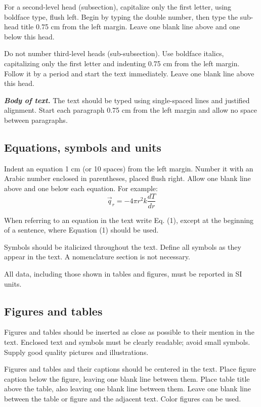 \documentclass[12pt,fleqn]{article}
\begin{document}
For a second-level head (subsection), capitalize only the first letter, using
boldface type, flush left. Begin by typing the double number, then type the
sub-head title 0.75 cm from the left margin. Leave one blank line above and one
below this head.

Do not number third-level heads (sub-subsection). Use boldface italics,
capitalizing only the first letter and indenting 0.75 cm from the left margin.
Follow it by a period and start the text immediately. Leave one blank line
above this head.

\vspace{0.5cm} %
%
\textbf{\textit{Body of text.}} The text should be typed using single-spaced
lines and justified alignment. Start each paragraph 0.75 cm from the left
margin and allow no space between paragraphs.

\subsection{Equations, symbols and units}
Indent an equation 1 cm (or 10 spaces) from the left margin. Number it with an
Arabic number enclosed in parentheses, placed flush right. Allow one blank line
above and one below each equation. For example:
\begin{equation}
\vec{q}_{r}=-4\pi r^{2}k\frac{dT}{dr}
\label{eq1}
\end{equation}

When referring to an equation in the text write Eq. (1), except at the
beginning of a sentence, where Equation (1) should be used.

Symbols should be italicized throughout the text. Define all symbols as they
appear in the text. A nomenclature section is not necessary.

All data, including those shown in tables and figures, must be reported in SI
units.

\subsection{Figures and tables}
Figures and tables should be inserted as close as possible to their mention in
the text. Enclosed text and symbols must be clearly readable; avoid small
symbols. Supply good quality pictures and illustrations.

Figures and tables and their captions should be centered in the text. Place
figure caption below the figure, leaving one blank line between them. Place
table title above the table, also leaving one blank line between them. Leave
one blank line between the table or figure and the adjacent text. Color figures
can be used.
\end{document}
